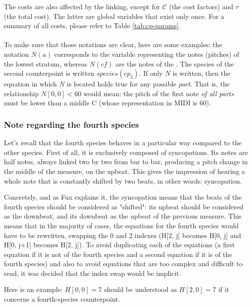 The costs are also affected by the linking, except for $\mathcal{C}$ (the cost factors) and $\tau$ (the total cost). The latter are global variables that exist only once. For a summary of all costs, please refer to Table \ref{tab:cp-params}.

\paragraph{}
To make sure that those notations are clear, here are some examples: the notation $N(a)$ corresponds to the variable representing the notes (pitches) of the lowest stratum, whereas $N(\mathit{cf})$ are the notes of the \cf. The species of the second counterpoint is written $species(cp_2)$. If only $N$ is written, then the equation in which $N$ is located holds true for any possible \textit{part}. That is, the relationship $N[0, 0] < 60$ would mean: the pitch of the first note \textit{of all parts} must be lower than a middle C (whose representation in MIDI is 60).

\subsubsection{Note regarding the fourth species}\label{nota-bene-4th-species} Let's recall that the fourth species behaves in a particular way compared to the other species. First of all, it is exclusively composed of syncopations. Its notes are half notes, always linked two by two from bar to bar, producing a pitch change in the middle of the measure, on the upbeat. This gives the impression of hearing a whole note that is constantly shifted by two beats, in other words: syncopation.

Concretely, and as Fux explains it, the syncopation means that the beats of the fourth species should be considered as "shifted": its upbeat should be considered as the downbeat, and its downbeat as the upbeat of the previous measure. This means that in the majority of cases, the equations for the fourth species would have to be rewritten, swapping the 0 and 2 indexes (H[2, j] becomes H[0, j] and H[0, j+1] becomes H[2, j]). To avoid duplicating each of the equations (a first equation if it is not of the fourth species and a second equation if it is of the fourth species) and also to avoid equations that are too complex and difficult to read, it was decided that the index swap would be implicit.

Here is an example: $H[0, 0] = 7$ should be understood as $H[2, 0] = 7$ if it concerns a fourth-species counterpoint.


